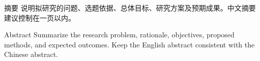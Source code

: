 \begin{MasterAbstract}{摘\quad 要}
说明拟研究的问题、选题依据、总体目标、研究方案及预期成果。中文摘要建议控制在一页以内。

\end{MasterAbstract}

\begin{MasterAbstract}{Abstract}
Summarize the research problem, rationale, objectives, proposed methods, and expected outcomes. Keep the English abstract consistent with the Chinese abstract.

\end{MasterAbstract}
